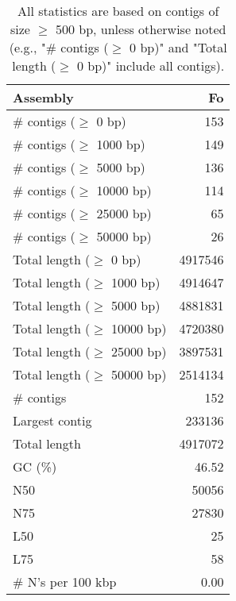 \documentclass[12pt,a4paper]{article}
\begin{document}
\begin{table}[ht]
\begin{center}
\caption{All statistics are based on contigs of size $\geq$ 500 bp, unless otherwise noted (e.g., "\# contigs ($\geq$ 0 bp)" and "Total length ($\geq$ 0 bp)" include all contigs).}
\begin{tabular}{|l*{1}{|r}|}
\hline
Assembly & Fo \\ \hline
\# contigs ($\geq$ 0 bp) & 153 \\ \hline
\# contigs ($\geq$ 1000 bp) & 149 \\ \hline
\# contigs ($\geq$ 5000 bp) & 136 \\ \hline
\# contigs ($\geq$ 10000 bp) & 114 \\ \hline
\# contigs ($\geq$ 25000 bp) & 65 \\ \hline
\# contigs ($\geq$ 50000 bp) & 26 \\ \hline
Total length ($\geq$ 0 bp) & 4917546 \\ \hline
Total length ($\geq$ 1000 bp) & 4914647 \\ \hline
Total length ($\geq$ 5000 bp) & 4881831 \\ \hline
Total length ($\geq$ 10000 bp) & 4720380 \\ \hline
Total length ($\geq$ 25000 bp) & 3897531 \\ \hline
Total length ($\geq$ 50000 bp) & 2514134 \\ \hline
\# contigs & 152 \\ \hline
Largest contig & 233136 \\ \hline
Total length & 4917072 \\ \hline
GC (\%) & 46.52 \\ \hline
N50 & 50056 \\ \hline
N75 & 27830 \\ \hline
L50 & 25 \\ \hline
L75 & 58 \\ \hline
\# N's per 100 kbp & 0.00 \\ \hline
\end{tabular}
\end{center}
\end{table}
\end{document}
